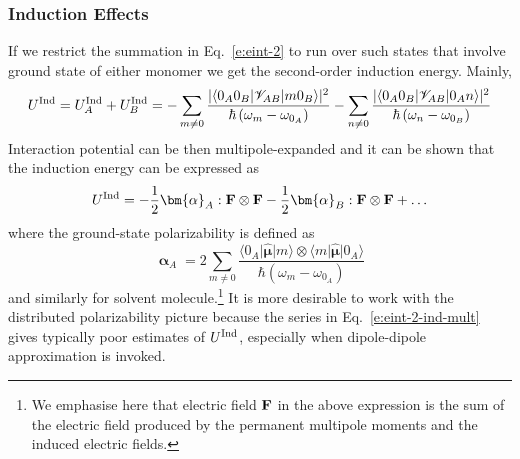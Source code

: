 \documentclass[b5paper,oneside,fleqn,11pt]{book}
\newcommand{\BM}[1]{\bm{#1}}
\begin{document}
\begin{refsection}
\subsubsection{Induction Effects\label{s:dw-poldisp-pol}}

If we restrict the summation in Eq.~\eqref{e:eint-2} to run over such states
that involve ground state of either monomer
we get the second\hyp{}order induction energy. Mainly,
%
\begin{equation} \label{e:eint-2-ind}
U^{\rm Ind} = U^{\rm Ind}_A + U^{\rm Ind}_B =
- \sum_{m\ne 0} \frac{
\lvert \langle 0_A0_B \lvert \mathscr{V}_{AB} \rvert m0_B \rangle \rvert^2
}{\hbar \left( \omega_{m} - \omega_{0_A}\right)}
%
- \sum_{n\ne 0} \frac{
\lvert \langle 0_A0_B \lvert \mathscr{V}_{AB} \rvert 0_An \rangle \rvert^2
}{\hbar \left( \omega_{n} - \omega_{0_B}\right)}
\end{equation}
%
Interaction potential can be then multipole\hyp{}expanded and
it can be shown that the induction energy
can be expressed as
%
\begin{equation} \label{e:eint-2-ind-mult}
U^{\rm Ind} = - \frac{1}{2} {\BM \alpha}_A : {\bf F} \otimes {\bf F} 
              - \frac{1}{2} {\BM \alpha}_B : {\bf F} \otimes {\bf F} + \ldots
\end{equation}
% 
where the ground\hyp{}state polarizability is defined as
%
\begin{equation} \label{e:polarizability}
{\BM \upalpha}_A = 2\sum_{m\neq 0} \frac{
\langle 0_A \lvert \hat{\BM \mu} \rvert m \rangle \otimes \langle m \lvert \hat{\BM \mu} \rvert 0_A \rangle 
}{\hbar \left( \omega_{m} - \omega_{0_A}\right)}
\end{equation}
%
and similarly for solvent molecule.\footnote{We emphasise here
that electric field $\bf F$ in the above expression
is the sum of the electric field produced by the permanent
multipole moments and the induced electric fields.}
It is more desirable to work with
the distributed polarizability picture because the series in 
Eq.~\eqref{e:eint-2-ind-mult} gives typically poor estimates of $U^{\rm Ind}$,
especially when dipole\hyp{}dipole approximation is invoked. 


\end{refsection}
\end{document}
